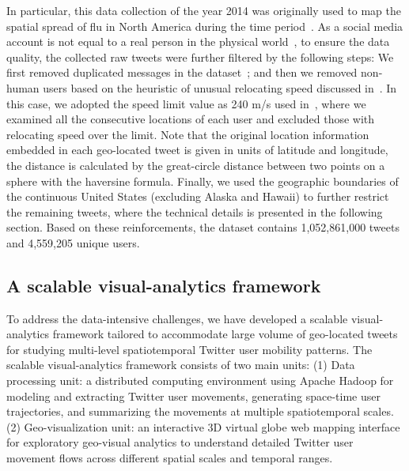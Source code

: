 \documentclass[ijgi,article,accept,moreauthors,pdftex,10pt,a4paper]{mdpi}
\theoremstyle{mdpi}
\newcounter{ex}
\newcounter{re}
\theoremstyle{mdpidefinition}
\begin{document}
In particular, this data collection of the year 2014 was originally used to map the spatial spread of flu in North America during the time period~\cite{padmanabhan2014flumapper}.
As a social media account is not equal to a real person in the physical world~\cite{tsou2015}, to ensure the data quality, the collected raw tweets were further filtered by the following steps: We first removed duplicated messages in the dataset~\cite{black2012twitter}; and then we removed non-human users based on the heuristic of unusual relocating speed discussed in~\cite{hawelka2014geo,Jurdak2015}.
In this case, we adopted the speed limit value as 240 m/s used in~\cite{Jurdak2015}, where we examined all the consecutive locations of each user and excluded those with relocating speed over the limit.
Note that the original location information embedded in each geo-located tweet is given in units of latitude and longitude, the distance is calculated by the great-circle distance between two points on a sphere with the haversine formula.
Finally, we used the geographic boundaries of the continuous United States (excluding Alaska and Hawaii) to further restrict the remaining tweets, where the technical details is presented in the following section. Based on these reinforcements, the dataset contains 1,052,861,000 tweets and 4,559,205 unique users.

\subsection{A scalable visual-analytics framework}
To address the data-intensive challenges, we have developed a scalable visual-analytics framework tailored to accommodate large volume of geo-located tweets for studying multi-level spatiotemporal Twitter user mobility patterns.
The scalable visual-analytics framework consists of two main units: (1) Data processing unit: a distributed computing environment using Apache Hadoop for modeling and extracting Twitter user movements, generating space-time user trajectories, and summarizing the movements at multiple spatiotemporal scales.
(2) Geo-visualization unit: an interactive 3D virtual globe web mapping interface for exploratory geo-visual analytics to understand detailed Twitter user movement flows across different spatial scales and temporal ranges. 
\end{document}
